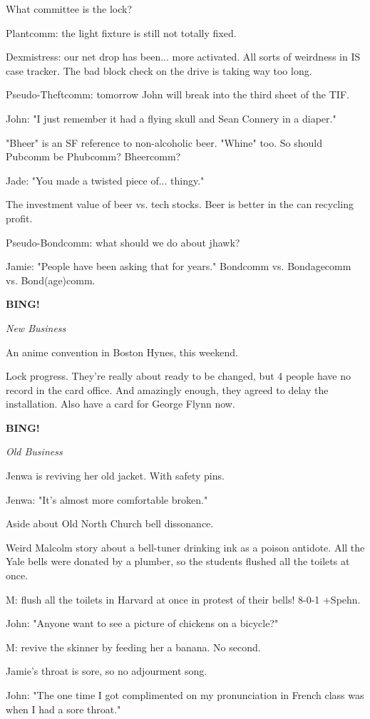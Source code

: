 \documentclass[12pt]{article}
\newcommand{\bing}{{\bf BING!} }
\newcommand{\goto}[1]{\bing \vskip 12pt \centerline{{\em{#1}}}}
\begin{document}
What committee is the lock?

Plantcomm: the light fixture is still not totally fixed.

Dexmistress: our net drop has been... more activated. All sorts of weirdness in IS case tracker. The bad block check on the drive is taking way too long.

Pseudo-Theftcomm: tomorrow John will break into the third sheet of the TIF.

John: "I just remember it had a flying skull and Sean Connery in a diaper."

"Bheer" is an SF reference to non-alcoholic beer. "Whine" too. So should Pubcomm be Phubcomm? Bheercomm?

Jade: "You made a twisted piece of... thingy."

The investment value of beer vs. tech stocks. Beer is better in the can recycling profit.

Pseudo-Bondcomm: what should we do about jhawk?

Jamie: "People have been asking that for years." Bondcomm vs. Bondagecomm vs. Bond(age)comm.

\goto{New Business}

An anime convention in Boston Hynes, this weekend.

Lock progress. They're really about ready to be changed, but 4 people have no record in the card office. And amazingly enough, they agreed to delay the installation. Also have a card for George Flynn now.

\goto{Old Business}

Jenwa is reviving her old jacket. With safety pins.

Jenwa: "It's almost more comfortable broken."

Aside about Old North Church bell dissonance.

Weird Malcolm story about a bell-tuner drinking ink as a poison antidote. All the Yale bells were donated by a plumber, so the students flushed all the toilets at once.

M: flush all the toilets in Harvard at once in protest of their bells! 8-0-1 +Spehn.

John: "Anyone want to see a picture of chickens on a bicycle?"

M: revive the skinner by feeding her a banana. No second.

Jamie's throat is sore, so no adjourment song.

John: "The one time I got complimented on my pronunciation in French class was when I had a sore throat."
\end{document}
